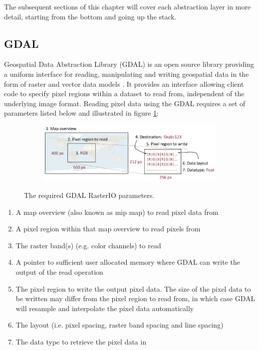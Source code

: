 The subsequent sections of this chapter will cover each abstraction layer in more detail, starting from the bottom and going up the stack.

\subsection{GDAL}
Geospatial Data Abstraction Library (GDAL) is an open source library providing a uniform interface for reading, manipulating and writing geospatial data in the form of raster and vector data models \cite{gdal}. It provides an interface allowing client code to specify pixel regions within a dataset to read from, independent of the underlying image format. Reading pixel data using the GDAL requires a set of parameters listed below and illustrated in figure \ref{fig:gdalio}:


\begin{figure}[!h]
    \centering
    \begin{subfigure}[!h]{1.0\textwidth}
        \includegraphics[width=\textwidth]{figures/implementation/pipeline/gdalio.pdf}
    \end{subfigure}
    \caption{The required GDAL RasterIO parameters.}
    \label{fig:gdalio}
\end{figure}

\begin{enumerate}
	\item A map overview (also known as mip map) to read pixel data from
	\item A pixel region within that map overview to read pixels from
	\item The raster band(s) (e.g. color channels) to read
	\item A pointer to sufficient user allocated memory where GDAL can write the output of the read operation
	\item The pixel region to write the output pixel data. The size of the pixel data to be written may differ from the pixel region to read from, in which case GDAL will resample and interpolate the pixel data automatically
	\item The layout (i.e. pixel spacing, raster band spacing and line spacing)
	\item The data type to retrieve the pixel data in
\end{enumerate}

